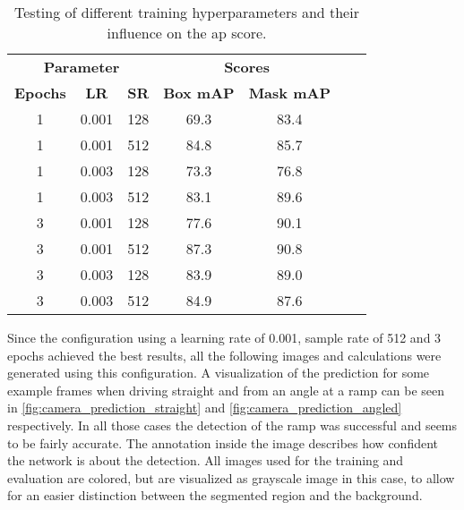 \begin{table}[htb]
	\centering
	\caption[Detection evaluation]{Testing of different training hyperparameters and their influence on the \acrshort{ap} score.}
	\label{tab:detection_eval}
	\begin{tabular}{ccccccc}
		\toprule
		\multicolumn{3}{c}{\textbf{Parameter} } & \multicolumn{2}{c}{\textbf{Scores} }                                                      \\
		\cmidrule(lr){1-3}                       \cmidrule(lr){4-5}
		\textbf{Epochs}                         & \textbf{LR}                          & \textbf{SR} & \textbf{Box mAP} & \textbf{Mask mAP} \\
		\midrule
		1                                       & 0.001                                & 128         & 69.3             & 83.4              \\
		1                                       & 0.001                                & 512         & 84.8             & 85.7              \\
		1                                       & 0.003                                & 128         & 73.3             & 76.8              \\
		1                                       & 0.003                                & 512         & 83.1             & 89.6              \\
		3                                       & 0.001                                & 128         & 77.6             & 90.1              \\
		3                                       & 0.001                                & 512         & 87.3             & 90.8              \\
		3                                       & 0.003                                & 128         & 83.9             & 89.0              \\
		3                                       & 0.003                                & 512         & 84.9             & 87.6              \\
		\bottomrule
	\end{tabular}
\end{table}
Since the configuration using a learning rate of 0.001, sample rate of 512 and 3 epochs achieved the best results, all the following images and calculations were generated using this configuration.
A visualization of the prediction for some example frames when driving straight and from an angle at a ramp can be seen in \cref{fig:camera_prediction_straight} and \cref{fig:camera_prediction_angled} respectively.
In all those cases the detection of the ramp was successful and seems to be fairly accurate.
The annotation inside the image describes how confident the network is about the detection.
All images used for the training and evaluation are colored, but are visualized as grayscale image in this case, to allow for an easier distinction between the segmented region and the background.

